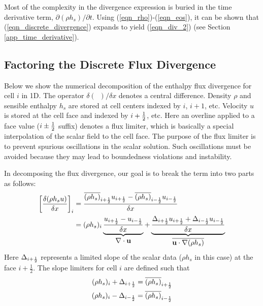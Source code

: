 Most of the complexity in the divergence expression is buried in the time derivative term, $\partial (\rho h_s)/\partial t$.  Using (\ref{eqn_rho})-(\ref{eqn_eos}), it can be shown that (\ref{eqn_discrete_divergence}) expands to yield (\ref{eqn_div_2}) (see Section \ref{app_time_derivative}).


\subsection{Factoring the Discrete Flux Divergence}
\label{app_transport_decomposition}

Below we show the numerical decomposition of the enthalpy flux divergence for cell $i$ in 1D.  The operator $\delta(\,\,\,)/\delta x$ denotes a central difference.  Density $\rho$ and sensible enthalpy $h_s$ are stored at cell centers indexed by $i$, $i+1$, etc.  Velocity $u$ is stored at the cell face and indexed by $i+\mbox{$\frac{1}{2}$}$, etc.  Here an overline applied to a face value ($i\pm\mbox{$\frac{1}{2}$}$ suffix) denotes a flux limiter, which is basically a special interpolation of the scalar field to the cell face.  The purpose of the flux limiter is to prevent spurious oscillations in the scalar solution.  Such oscillations must be avoided because they may lead to boundedness violations and instability.

In decomposing the flux divergence, our goal is to break the term into two parts as follows:
\begin{align}
\label{eqn_flux_decomposition}
\left[\frac{\delta (\rho h_s u)}{\delta x}\right]_i &= \frac{ \overline{(\rho h_s)}_{i+\mbox{\tiny $\frac{1}{2}$}} u_{i+\mbox{\tiny $\frac{1}{2}$}} - \overline{(\rho h_s)}_{i-\mbox{\tiny $\frac{1}{2}$}} u_{i-\mbox{\tiny $\frac{1}{2}$}} }{\delta x} \notag\\
&= (\rho h_s)_i \underbrace{\frac{u_{i+\mbox{\tiny $\frac{1}{2}$}}-u_{i-\mbox{\tiny $\frac{1}{2}$}}}{\delta x}}_{\displaystyle\nabla\cdot\mathbf{u}} + \underbrace{\frac{\Delta_{i+\mbox{\tiny $\frac{1}{2}$}} u_{i+\mbox{\tiny $\frac{1}{2}$}} + \Delta_{i-\mbox{\tiny $\frac{1}{2}$}} u_{i-\mbox{\tiny $\frac{1}{2}$}}}{\delta x}}_{\displaystyle\overline{\mathbf{u}\cdot\nabla(\rho h_s)}}
\end{align}
Here $\Delta_{i+\mbox{\tiny $\frac{1}{2}$}}$ represents a limited slope of the scalar data ($\rho h_s$ in this case) at the face $i+\frac{1}{2}$.  The slope limiters for cell $i$ are defined such that
\begin{align}
\label{eqn_slope_1} (\rho h_s)_i + \Delta_{i+\mbox{\tiny $\frac{1}{2}$}} = \overline{(\rho h_s)}_{i+\mbox{\tiny $\frac{1}{2}$}} \\
\label{eqn_slope_2} (\rho h_s)_i - \Delta_{i-\mbox{\tiny $\frac{1}{2}$}} = \overline{(\rho h_s)}_{i-\mbox{\tiny $\frac{1}{2}$}}
\end{align}

